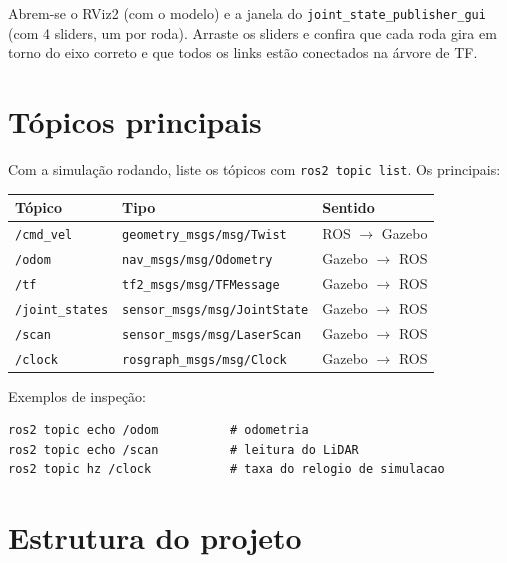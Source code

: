 \documentclass[11pt,a4paper]{article}
\begin{document}
\noindent
Abrem-se o RViz2 (com o modelo) e a janela do
\texttt{joint\_state\_publisher\_gui} (com 4 sliders, um por roda). Arraste os
sliders e confira que cada roda gira em torno do eixo correto e que todos os
links estão conectados na árvore de TF.

\section{Tópicos principais}

Com a simulação rodando, liste os tópicos com \texttt{ros2 topic list}. Os
principais:

\begin{center}
\begin{tabular}{lll}
\toprule
\textbf{Tópico} & \textbf{Tipo} & \textbf{Sentido} \\
\midrule
\texttt{/cmd\_vel}     & \texttt{geometry\_msgs/msg/Twist}     & ROS $\rightarrow$ Gazebo \\
\texttt{/odom}         & \texttt{nav\_msgs/msg/Odometry}       & Gazebo $\rightarrow$ ROS \\
\texttt{/tf}           & \texttt{tf2\_msgs/msg/TFMessage}      & Gazebo $\rightarrow$ ROS \\
\texttt{/joint\_states} & \texttt{sensor\_msgs/msg/JointState} & Gazebo $\rightarrow$ ROS \\
\texttt{/scan}         & \texttt{sensor\_msgs/msg/LaserScan}   & Gazebo $\rightarrow$ ROS \\
\texttt{/clock}        & \texttt{rosgraph\_msgs/msg/Clock}     & Gazebo $\rightarrow$ ROS \\
\bottomrule
\end{tabular}
\end{center}

\noindent
Exemplos de inspeção:

\begin{lstlisting}
ros2 topic echo /odom          # odometria
ros2 topic echo /scan          # leitura do LiDAR
ros2 topic hz /clock           # taxa do relogio de simulacao
\end{lstlisting}

\section{Estrutura do projeto}
\end{document}
